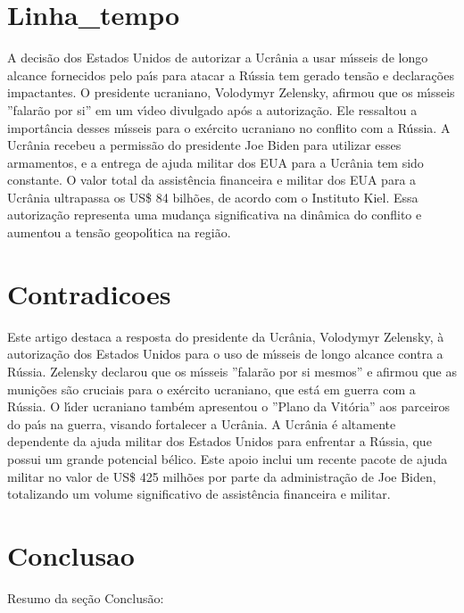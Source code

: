 \documentclass{article}%
\begin{document}
%
\section{Linha\_tempo}%
\label{sec:Linhatempo}%
A decis\~ao dos Estados Unidos de autorizar a Ucr\^ania a usar m{\'\i}sseis de longo alcance fornecidos pelo pa{\'\i}s para atacar a R\'ussia tem gerado tens\~ao e declara\c{c}\~oes impactantes. O presidente ucraniano, Volodymyr Zelensky, afirmou que os m{\'\i}sseis ''falar\~ao por si'' em um v{\'\i}deo divulgado ap\'os a autoriza\c{c}\~ao. Ele ressaltou a import\^ancia desses m{\'\i}sseis para o ex\'ercito ucraniano no conflito com a R\'ussia. A Ucr\^ania recebeu a permiss\~ao do presidente Joe Biden para utilizar esses armamentos, e a entrega de ajuda militar dos EUA para a Ucr\^ania tem sido constante. O valor total da assist\^encia financeira e militar dos EUA para a Ucr\^ania ultrapassa os US\$ 84 bilh\~oes, de acordo com o Instituto Kiel. Essa autoriza\c{c}\~ao representa uma mudan\c{c}a significativa na din\^amica do conflito e aumentou a tens\~ao geopol{\'\i}tica na regi\~ao.

%
\section{Contradicoes}%
\label{sec:Contradicoes}%
Este artigo destaca a resposta do presidente da Ucr\^ania, Volodymyr Zelensky, \`a autoriza\c{c}\~ao dos Estados Unidos para o uso de m{\'\i}sseis de longo alcance contra a R\'ussia. Zelensky declarou que os m{\'\i}sseis ''falar\~ao por si mesmos'' e afirmou que as muni\c{c}\~oes s\~ao cruciais para o ex\'ercito ucraniano, que est\'a em guerra com a R\'ussia. O l{\'\i}der ucraniano tamb\'em apresentou o ''Plano da Vit\'oria'' aos parceiros do pa{\'\i}s na guerra, visando fortalecer a Ucr\^ania. A Ucr\^ania \'e altamente dependente da ajuda militar dos Estados Unidos para enfrentar a R\'ussia, que possui um grande potencial b\'elico. Este apoio inclui um recente pacote de ajuda militar no valor de US\$ 425 milh\~oes por parte da administra\c{c}\~ao de Joe Biden, totalizando um volume significativo de assist\^encia financeira e militar.

%
\section{Conclusao}%
\label{sec:Conclusao}%
Resumo da se\c{c}\~ao Conclus\~ao:
\end{document}
